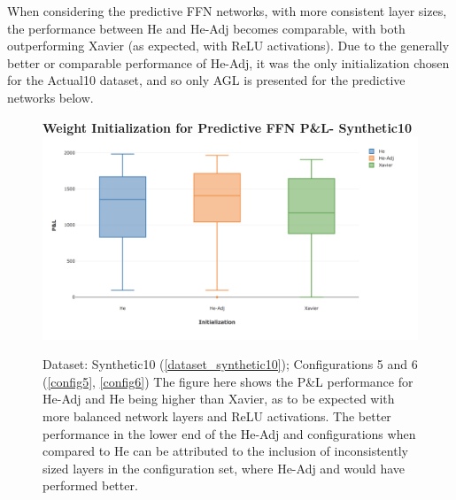 \documentclass[a4paper,11pt,oneside]{article}
\theoremstyle{plain}
\theoremstyle{definition}
\begin{document}
When considering the predictive FFN networks, with more consistent layer sizes, the performance between He and He-Adj becomes comparable, with both outperforming Xavier (as expected, with ReLU activations). Due to the generally better or comparable performance of He-Adj, it was the only initialization chosen for the Actual10 dataset, and so only AGL is presented for the predictive networks below.


\begin{figure}[H]
	\centering
	\textbf{Weight Initialization for Predictive FFN P\&L- Synthetic10}
	\includegraphics[scale=0.35]{images/results/init/Synthetic10_pl.png}
	\caption{Dataset: Synthetic10 (\ref{dataset_synthetic10}); Configurations 5 and 6 (\ref{config5}, \ref{config6})
		\newline The figure here shows the P\&L performance for He-Adj and He being higher than Xavier, as to be expected with more balanced network layers and ReLU activations. The better performance in the lower end of the He-Adj and configurations when compared to He can be attributed to the inclusion of inconsistently sized layers in the configuration set, where He-Adj and would have performed better.}
	\label{figure-init4_ffn_init}
\end{figure}
\end{document}
